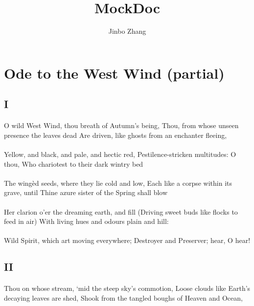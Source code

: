 \documentclass{doc}
\author{Jinbo Zhang}
\title{MockDoc}
\begin{document}
	\maketitle
	\section{Ode to the West Wind (partial)}
		\subsection{I}
			\paragraph{}
				O wild West Wind, thou breath of Autumn’s being,
				Thou, from whose unseen presence the leaves dead
				Are driven, like ghosts from an enchanter fleeing,
			\paragraph{}
				Yellow, and black, and pale, and hectic red,
				Pestilence-stricken multitudes: O thou,
				Who chariotest to their dark wintry bed
			\paragraph{}
				The wingèd seeds, where they lie cold and low,
				Each like a corpse within its grave, until
				Thine azure sister of the Spring shall blow
			\paragraph{}
				Her clarion o’er the dreaming earth, and fill
				(Driving sweet buds like flocks to feed in air)
				With living hues and odours plain and hill:
			\paragraph{}
				Wild Spirit, which art moving everywhere;
				Destroyer and Preserver; hear, O hear!
		\subsection{II}
			\paragraph{}
				Thou on whose stream, ‘mid the steep sky’s commotion,
				Loose clouds like Earth’s decaying leaves are shed,
				Shook from the tangled boughs of Heaven and Ocean,
\end{document}
